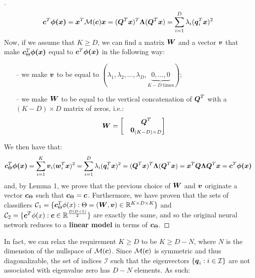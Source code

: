 \documentclass{exam}
\begin{document}
\begin{questions}
\begin{proof}[\unskip\nopunct]
        \[
            \vb*{c}^T \vb*{\phi(x)} =  \vb*{x}^T \mathcal{M}(\vb*{c}) \vb*{x} = (\vb*{Q}^T \vb*{x})^T \vb*{\Lambda} (\vb*{Q}^T \vb*{x}) = \sum_{i = 1}^{D} \lambda_i (\vb*{q}_i^T\vb*{x})^2
        \]
        Now, if we assume that $K \ge D$, we can find a matrix $\vb*{W}$ and a vector $\vb*{v}$ that make $\vb*{c}^T_{\Theta} \vb*{\phi(x)}$ equal to $\vb*{c}^T \vb*{\phi(x)}$ in the following way:
        \begin{itemize}
            \item[--] we make $\vb*{v}$ to be equal to $(\lambda_1, \lambda_2, \dots, \lambda_D, \underbrace{0, \dots, 0}_{K - D \: \text{times}})$;
            \item[--] we make $\vb*{W}$ to be equal to the vertical concatenation of $\vb*{Q}^T$ with a $(K - D) \times D$ matrix of zeros, i.e.:
            \begin{align*}
            \vb*{W} = 
                \begin{bmatrix}
                    &\vb*{Q}^T \\
                    &\vb*{0}_{(K - D) \times D}
                \end{bmatrix}
            \end{align*}
        \end{itemize}
        We then have that:
        \[
            \vb*{c}^T_{\Theta} \vb*{\phi(x)} = \sum_{i = 1}^{K} \vb*{v}_i (\vb*{w}_i^T\vb*{x})^2 =  \sum_{i = 1}^{D} \lambda_i (\vb*{q}_i^T\vb*{x})^2 = (\vb*{Q}^T \vb*{x})^T \vb*{\Lambda} (\vb*{Q}^T \vb*{x}) = \vb*{x}^T \vb*{Q} \vb*{\Lambda}\vb*{Q}^T \vb*{x} = \vb*{c}^T \vb*{\phi(x)}
        \]
        and, by Lemma 1, we prove that the previous choice of $\vb*{W}$ and $\vb*{v}$ originate a vector $\vb*{c}_{\Theta}$ such that $\vb*{c}_{\Theta} = \vb*{c}$. Furthermore, we have proven that the sets of classifiers $\mathcal{C}_1 = \{\vb*{c}_{\Theta}^T\phi(x) : \Theta = (\vb*{W}, \vb*{v}) \in \mathbb{R}^{K \times D \times K}\}$ and $\mathcal{C}_2 = \{\vb*{c}^T\phi(x) : \vb*{c} \in \mathbb{R}^{\frac{D(D + 1)}{2}}\}$ are exactly the same, and so the original neural network reduces to a \textbf{linear model} in terms of $\vb*{c}_{\Theta}$.
        \end{proof}
        In fact, we can relax the requirement $K \ge D$ to be $K \ge D - N$, where $N$ is the dimension of the nullspace of $\mathcal{M}(\vb*{c})$. Since $\mathcal{M}(\vb*{c})$ is symmetric and thus diagonalizable, the set of indices $\mathcal{I}$ such that the eigenvectors $\{\vb*{q}_i : i \in \mathcal{I}\}$ are not associated with eigenvalue zero has $D - N$ elements. As such:

\end{questions}
\end{document}
